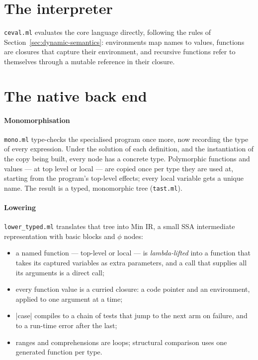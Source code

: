 \section{The interpreter}

\texttt{ceval.ml} evaluates the core language directly, following the rules
of Section~\ref{sec:dynamic-semantics}: environments map names to values,
functions are closures that capture their environment, and recursive
functions refer to themselves through a mutable reference in their closure.

\section{The native back end}
\label{sec:native}

\paragraph{Monomorphisation} \texttt{mono.ml} type-checks the specialised
program once more, now recording the type of every expression. Under the
solution of each definition, and the instantiation of the copy being built,
every node has a concrete type. Polymorphic functions and values --- at top
level or local --- are copied once per type they are used at, starting from
the program's top-level effects; every local variable gets a unique name. The
result is a typed, monomorphic tree (\texttt{tast.ml}).

\paragraph{Lowering} \texttt{lower\_typed.ml} translates that tree into Min
IR, a small SSA intermediate representation with basic blocks and $\phi$
nodes:
\begin{itemize}
  \item a named function --- top-level or local --- is \emph{lambda-lifted}
    into a function that takes its captured variables as extra parameters,
    and a call that supplies all its arguments is a direct call;
  \item every function value is a curried closure: a code pointer and an
    environment, applied to one argument at a time;
  \item \fc|case| compiles to a chain of tests that jump to the next arm on
    failure, and to a run-time error after the last;
  \item ranges and comprehensions are loops; structural comparison uses one
    generated function per type.
\end{itemize}


